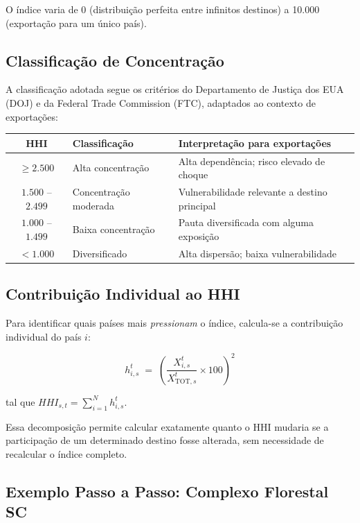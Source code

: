 \documentclass[12pt, a4paper]{article}
\begin{document}
O índice varia de 0 (distribuição perfeita entre infinitos destinos)
a 10.000 (exportação para um único país).

\subsection{Classificação de Concentração}

A classificação adotada segue os critérios do
Departamento de Justiça dos EUA (DOJ) e da Federal Trade Commission (FTC),
adaptados ao contexto de exportações:

\begin{center}
\renewcommand{\arraystretch}{1.3}
\begin{tabular}{cll}
\toprule
\textbf{HHI} & \textbf{Classificação} & \textbf{Interpretação para exportações} \\
\midrule
$\geq 2.500$        & Alta concentração      & Alta dependência; risco elevado de choque \\
$1.500$ -- $2.499$  & Concentração moderada  & Vulnerabilidade relevante a destino principal \\
$1.000$ -- $1.499$  & Baixa concentração     & Pauta diversificada com alguma exposição \\
$< 1.000$           & Diversificado          & Alta dispersão; baixa vulnerabilidade \\
\bottomrule
\end{tabular}
\end{center}

\subsection{Contribuição Individual ao HHI}

Para identificar quais países mais \emph{pressionam} o índice,
calcula-se a contribuição individual do país $i$:

\begin{equation}
  h_{i,s}^{t}
    \;=\; \left(\frac{X_{i,s}^{t}}{X_{\text{TOT},s}^{t}} \times 100\right)^{\!2}
  \label{eq:contrib}
\end{equation}

tal que $HHI_{s,t} = \displaystyle\sum_{i=1}^{N} h_{i,s}^{t}$.

Essa decomposição permite calcular exatamente quanto o HHI mudaria
se a participação de um determinado destino fosse alterada,
sem necessidade de recalcular o índice completo.

\subsection{Exemplo Passo a Passo: Complexo Florestal SC}
\end{document}
